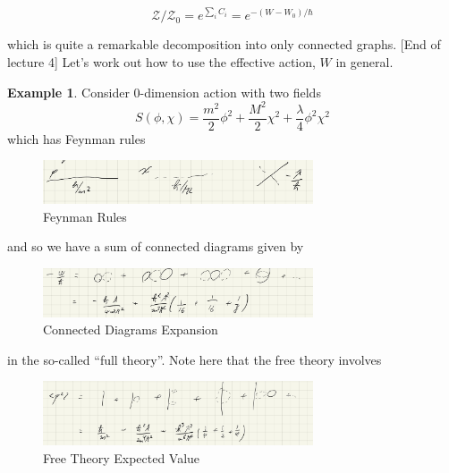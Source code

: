 \documentclass{article}
\theoremstyle{definition}
\newtheorem{example}{Example}
\begin{document}
\begin{equation}
  \mathcal{Z} / \mathcal{Z}_0 = e^{\sum_i C_i} = e^{-(W - W_0) / \hbar}
\end{equation}

which is quite a remarkable decomposition into only connected graphs. [End of
lecture 4] Let's work out how to use the effective action, $W$ in general.

\begin{example}
  Consider 0-dimension action with two fields
  \begin{equation}
    S(\phi, \chi) = \frac{m^2}{2} \phi^2 + \frac{M^2}{2} \chi^2 +
    \frac{\lambda}{4} \phi^2 \chi^2
  \end{equation}
  which has Feynman rules
  \begin{figure}[H]
    \centering
    \includegraphics[width=8cm]{res/AQFT/lec_5_effective_action_feynman_rules}
    \caption{Feynman Rules}
    \label{lec_5_effective_action_feynman_rules}
  \end{figure}
  and so we have a sum of connected diagrams given by
  \begin{figure}[H]
    \centering
    \includegraphics[width=8cm]{res/AQFT/lec_5_connected_diagrams}
    \caption{Connected Diagrams Expansion}
    \label{lec_5_connected_diagrams}
  \end{figure}
  in the so-called ``full theory''. Note here that the free theory involves
  \begin{figure}[H]
    \centering
    \includegraphics[width=8cm]{res/AQFT/lec_5_free_theory}
    \caption{Free Theory Expected Value}
    \label{lec_5_free_theory}
  \end{figure}


\end{example}
\end{document}
